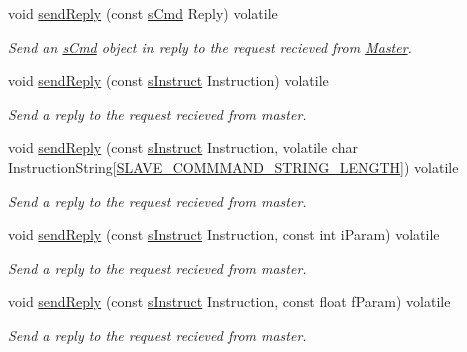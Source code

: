 \begin{DoxyCompactItemize}
void \mbox{\hyperlink{class_master_a7d0570bae901dbbd7c88db131fea03c5}{send\+Reply}} (const \mbox{\hyperlink{structs_cmd}{s\+Cmd}} Reply) volatile
\begin{DoxyCompactList}\small\item\em Send an \mbox{\hyperlink{structs_cmd}{s\+Cmd}} object in reply to the request recieved from \mbox{\hyperlink{class_master}{Master}}. \end{DoxyCompactList}\item 
void \mbox{\hyperlink{class_master_a109e347c1b70f26a82d48dfb13af3fe8}{send\+Reply}} (const \mbox{\hyperlink{_s_p_i___instruction_set_8h_a949ec019a0f52780dcdd7d5a5ba73e47}{s\+Instruct}} Instruction) volatile
\begin{DoxyCompactList}\small\item\em Send a reply to the request recieved from master. \end{DoxyCompactList}\item 
void \mbox{\hyperlink{class_master_abebea7ffc56886ac9b59980312ea19f9}{send\+Reply}} (const \mbox{\hyperlink{_s_p_i___instruction_set_8h_a949ec019a0f52780dcdd7d5a5ba73e47}{s\+Instruct}} Instruction, volatile char Instruction\+String\mbox{[}\mbox{\hyperlink{_s_p_i___instruction_set_8h_afb2f23f8980c03317ec47ce151335ec7}{S\+L\+A\+V\+E\+\_\+\+C\+O\+M\+M\+M\+A\+N\+D\+\_\+\+S\+T\+R\+I\+N\+G\+\_\+\+L\+E\+N\+G\+TH}}\mbox{]}) volatile
\begin{DoxyCompactList}\small\item\em Send a reply to the request recieved from master. \end{DoxyCompactList}\item 
void \mbox{\hyperlink{class_master_a26d84a77b85fdd81db98ccd23d0e882f}{send\+Reply}} (const \mbox{\hyperlink{_s_p_i___instruction_set_8h_a949ec019a0f52780dcdd7d5a5ba73e47}{s\+Instruct}} Instruction, const int i\+Param) volatile
\begin{DoxyCompactList}\small\item\em Send a reply to the request recieved from master. \end{DoxyCompactList}\item 
void \mbox{\hyperlink{class_master_a68d7ac6a3680ac2b4c3620b6e175d97f}{send\+Reply}} (const \mbox{\hyperlink{_s_p_i___instruction_set_8h_a949ec019a0f52780dcdd7d5a5ba73e47}{s\+Instruct}} Instruction, const float f\+Param) volatile
\begin{DoxyCompactList}\small\item\em Send a reply to the request recieved from master. \end{DoxyCompactList}\item 

\end{DoxyCompactItemize}
